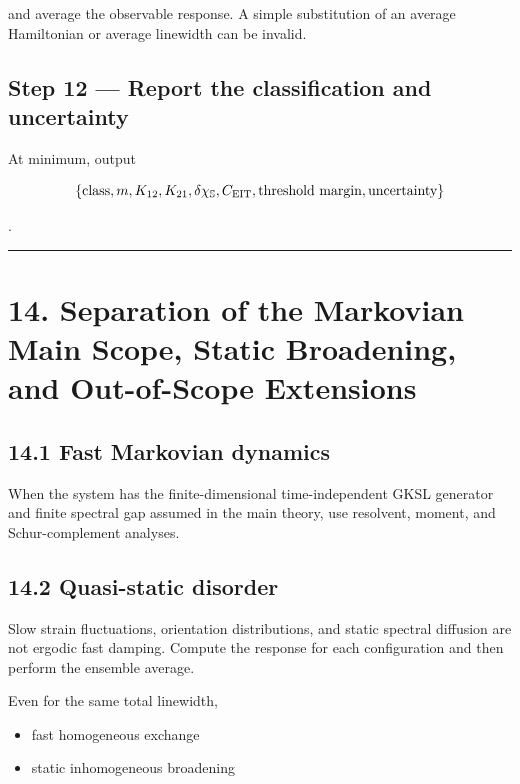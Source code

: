 \documentclass[
  10pt,
  a4paper,
]{article}
\providecommand{\tightlist}{%
  \setlength{\itemsep}{0pt}\setlength{\parskip}{0pt}}
\begin{document}
and average the observable response. A simple substitution of an average
Hamiltonian or average linewidth can be invalid.

\subsection{Step 12 --- Report the classification and
uncertainty}\label{step-12-report-the-classification-and-uncertainty}

At minimum, output

\[
\{\text{class},m,K_{12},K_{21},\delta\chi_{\mathbb S},C_{\rm EIT},\text{threshold margin},\text{uncertainty}\}
\]

.

\begin{center}\rule{0.5\linewidth}{0.5pt}\end{center}

\section{14. Separation of the Markovian Main Scope, Static Broadening,
and Out-of-Scope
Extensions}\label{separation-of-the-markovian-main-scope-static-broadening-and-out-of-scope-extensions}

\subsection{14.1 Fast Markovian dynamics}\label{fast-markovian-dynamics}

When the system has the finite-dimensional time-independent GKSL
generator and finite spectral gap assumed in the main theory, use
resolvent, moment, and Schur-complement analyses.

\subsection{14.2 Quasi-static disorder}\label{quasi-static-disorder}

Slow strain fluctuations, orientation distributions, and static spectral
diffusion are not ergodic fast damping. Compute the response for each
configuration and then perform the ensemble average.

Even for the same total linewidth,

\begin{itemize}
\tightlist
\item
  fast homogeneous exchange
\item
  static inhomogeneous broadening
\end{itemize}
\end{document}
